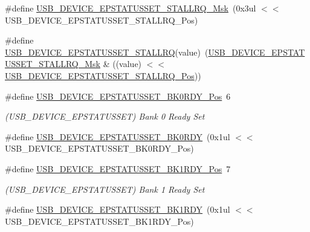 \begin{DoxyCompactItemize}
\#define \mbox{\hyperlink{group___s_a_m_d21___u_s_b_gaae299d271b8aaf0f30dca30c7b6aca4c}{U\+S\+B\+\_\+\+D\+E\+V\+I\+C\+E\+\_\+\+E\+P\+S\+T\+A\+T\+U\+S\+S\+E\+T\+\_\+\+S\+T\+A\+L\+L\+R\+Q\+\_\+\+Msk}}~(0x3ul $<$$<$ U\+S\+B\+\_\+\+D\+E\+V\+I\+C\+E\+\_\+\+E\+P\+S\+T\+A\+T\+U\+S\+S\+E\+T\+\_\+\+S\+T\+A\+L\+L\+R\+Q\+\_\+\+Pos)
\item 
\#define \mbox{\hyperlink{group___s_a_m_d21___u_s_b_ga9b98192a006e789d27bf775a27b996d7}{U\+S\+B\+\_\+\+D\+E\+V\+I\+C\+E\+\_\+\+E\+P\+S\+T\+A\+T\+U\+S\+S\+E\+T\+\_\+\+S\+T\+A\+L\+L\+RQ}}(value)~(\mbox{\hyperlink{group___s_a_m_d21___u_s_b_gaae299d271b8aaf0f30dca30c7b6aca4c}{U\+S\+B\+\_\+\+D\+E\+V\+I\+C\+E\+\_\+\+E\+P\+S\+T\+A\+T\+U\+S\+S\+E\+T\+\_\+\+S\+T\+A\+L\+L\+R\+Q\+\_\+\+Msk}} \& ((value) $<$$<$ \mbox{\hyperlink{group___s_a_m_d21___u_s_b_ga0282af70f24c564c61a99201844fa35f}{U\+S\+B\+\_\+\+D\+E\+V\+I\+C\+E\+\_\+\+E\+P\+S\+T\+A\+T\+U\+S\+S\+E\+T\+\_\+\+S\+T\+A\+L\+L\+R\+Q\+\_\+\+Pos}}))
\item 
\#define \mbox{\hyperlink{group___s_a_m_d21___u_s_b_ga6af786fbaa30ffbc8723e0d56c7479bd}{U\+S\+B\+\_\+\+D\+E\+V\+I\+C\+E\+\_\+\+E\+P\+S\+T\+A\+T\+U\+S\+S\+E\+T\+\_\+\+B\+K0\+R\+D\+Y\+\_\+\+Pos}}~6
\begin{DoxyCompactList}\small\item\em (U\+S\+B\+\_\+\+D\+E\+V\+I\+C\+E\+\_\+\+E\+P\+S\+T\+A\+T\+U\+S\+S\+ET) Bank 0 Ready Set \end{DoxyCompactList}\item 
\#define \mbox{\hyperlink{group___s_a_m_d21___u_s_b_ga8b0d7ad58ae2be32b26bc3ebc41faf0d}{U\+S\+B\+\_\+\+D\+E\+V\+I\+C\+E\+\_\+\+E\+P\+S\+T\+A\+T\+U\+S\+S\+E\+T\+\_\+\+B\+K0\+R\+DY}}~(0x1ul $<$$<$ U\+S\+B\+\_\+\+D\+E\+V\+I\+C\+E\+\_\+\+E\+P\+S\+T\+A\+T\+U\+S\+S\+E\+T\+\_\+\+B\+K0\+R\+D\+Y\+\_\+\+Pos)
\item 
\#define \mbox{\hyperlink{group___s_a_m_d21___u_s_b_gaab24037420b07a4688539994ec6b733a}{U\+S\+B\+\_\+\+D\+E\+V\+I\+C\+E\+\_\+\+E\+P\+S\+T\+A\+T\+U\+S\+S\+E\+T\+\_\+\+B\+K1\+R\+D\+Y\+\_\+\+Pos}}~7
\begin{DoxyCompactList}\small\item\em (U\+S\+B\+\_\+\+D\+E\+V\+I\+C\+E\+\_\+\+E\+P\+S\+T\+A\+T\+U\+S\+S\+ET) Bank 1 Ready Set \end{DoxyCompactList}\item 
\#define \mbox{\hyperlink{group___s_a_m_d21___u_s_b_ga08e0c82fa316f0e828b90f1c5436f87a}{U\+S\+B\+\_\+\+D\+E\+V\+I\+C\+E\+\_\+\+E\+P\+S\+T\+A\+T\+U\+S\+S\+E\+T\+\_\+\+B\+K1\+R\+DY}}~(0x1ul $<$$<$ U\+S\+B\+\_\+\+D\+E\+V\+I\+C\+E\+\_\+\+E\+P\+S\+T\+A\+T\+U\+S\+S\+E\+T\+\_\+\+B\+K1\+R\+D\+Y\+\_\+\+Pos)

\end{DoxyCompactItemize}
